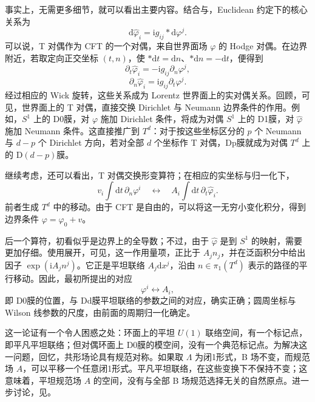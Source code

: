 事实上，无需更多细节，就可以看出主要内容。结合与，Euclidean 约定下的核心关系为
\[
\mathrm{d}\widehat\varphi_i
=\mathrm{i}g_{ij}*\mathrm{d}\varphi^j.
\]
可以说，T 对偶作为 CFT 的一个对偶，来自世界面场 $\varphi$ 的 Hodge 对偶。在边界附近，若取定向正交坐标 $(t,n)$，使 $*\mathrm{d}t=\mathrm{d}n$、$*\mathrm{d}n=-\mathrm{d}t$，便得到
\begin{equation}\label{eq:3.159}
\partial_t\widehat\varphi_i
=-\mathrm{i}g_{ij}\partial_n\varphi^j,
\end{equation}
\begin{equation}\label{eq:3.160}
\partial_n\widehat\varphi_i
=\mathrm{i}g_{ij}\partial_t\varphi^j.
\end{equation}
经过相应的 Wick 旋转，这些关系成为 Lorentz 世界面上的实对偶关系。回顾，可见，世界面上的 T 对偶，直接交换 Dirichlet 与 Neumann 边界条件的作用。例如，$S^1$ 上的 D0膜，对 $\varphi$ 施加 Dirichlet 条件，将成为对偶 $S^1$ 上的 D1膜，对 $\widehat\varphi$ 施加 Neumann 条件。这直接推广到 $T^d$：对于按这些坐标区分的 $p$ 个 Neumann 与 $d-p$ 个 Dirichlet 方向，若对全部 $d$ 个坐标作 T 对偶，Dp膜就成为对偶 $T^d$ 上的 D$(d-p)$膜。

继续考虑，还可以看出，T 对偶交换形变算符；在相应的实坐标与归一化下，
\[
v_i\int\mathrm{d}t\,\partial_n\varphi^i
\quad\longleftrightarrow\quad
A_i\int\mathrm{d}t\,\partial_t\widehat\varphi_i.
\]
前者生成 $T^d$ 中的移动。由于 CFT 是自由的，可以将这一无穷小变化积分，得到边界条件 $\varphi=\varphi_0+v$。

后一个算符，初看似乎是边界上的全导数；不过，由于 $\widehat\varphi$ 是到 $S^1$ 的映射，需要更加仔细。使用展开，可见，这一作用量项，正比于 $A_jn_j$，并在泛函积分中给出因子 $\exp(\mathrm{i}A_jn^j)$。它正是平坦联络 $A_j\mathrm{d}x^j$，沿由 $n\in\pi_1(T^d)$ 表示的路径的平行移动。因此，最初所提出的对应
\begin{equation}\label{eq:3.161}
\varphi^i\longleftrightarrow A_i,
\end{equation}
即 D0膜的位置，与 Dd膜平坦联络的参数之间的对应，确实正确；圆周坐标与 Wilson 线参数的尺度，由前面的周期归一化确定。

这一论证有一个令人困惑之处：环面上的平坦 $U(1)$ 联络空间，有一个标记点，即平凡平坦联络；但对偶环面上 D0膜的模空间，没有一个典范标记点。为解决这一问题，回忆，共形场论具有规范对称。如果取 $\Lambda$ 为闭1形式，B 场不变，而规范场 $A$，可以平移一个任意闭1形式。平凡平坦联络，在这些变换下不保持不变；这意味着，平坦规范场 $A$ 的空间，没有与全部 B 场规范选择无关的自然原点。进一步讨论，见。

